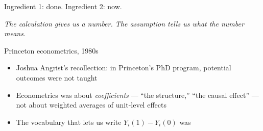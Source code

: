 \documentclass[aspectratio=169,11pt]{beamer}
\begin{document}

\begin{frame}{Ingredient 1: done. Ingredient 2: now.}
\vspace{0.4em}
\begin{center}
\end{center}
\vspace{0.6em}
\begin{center}
\small\color{warmgray}\itshape The calculation gives us a number. The assumption tells us what the number means.
\end{center}
\end{frame}

\begin{frame}{Princeton econometrics, 1980s}
\vspace{0.6em}
\begin{itemize}
  \item Joshua Angrist's recollection: in Princeton's PhD program, potential outcomes were not taught
  \item Econometrics was about \textit{coefficients} --- ``the structure,'' ``the causal effect'' --- not about weighted averages of unit-level effects
  \item The vocabulary that lets us write $Y_i(1) - Y_i(0)$ was 
\end{itemize}
\end{frame}
\end{document}

